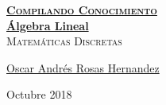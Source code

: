 \documentclass[12pt, fleqn]{article}                            %
\author{Oscar Andrés Rosas}                                     %
\theoremstyle{break}                                            %
\begin{document}
\begin{titlepage}
    
    \pagecolor{TitlePageColor}                                      %
    \color{white}                                                   %

    \vspace                                                         %
    \baselineskip                                                   %

    \makebox[0pt][l]{\rule{1.3\textwidth}{3pt}}                     %
    
    \href{https://compilandoconocimiento.com}                       %
    {\textbf{\textsc{\Huge Compilando Conocimiento}}}\\[2.7cm]      %

    \href{\ProjectNameLink}                                         %
    {\fontsize{65}{78}\selectfont \textbf{Álgebra Lineal}}\\[0.5cm] %
    \textcolor{ColorSubtext}{\textsc{\Huge Matemáticas Discretas}}  %
    
    \vfill                                                          %
    
    \href{\ProjectAuthorLink}                                       %
    {\LARGE \textsf{Oscar Andrés Rosas Hernandez}}                  %

    \vspace                                                         %
    \baselineskip                                                   %
    
    {\large \textsf{Octubre 2018}}                                  %
\end{titlepage}


\restoregeometry                                                    %
\nopagecolor                                                        %
\end{document}
